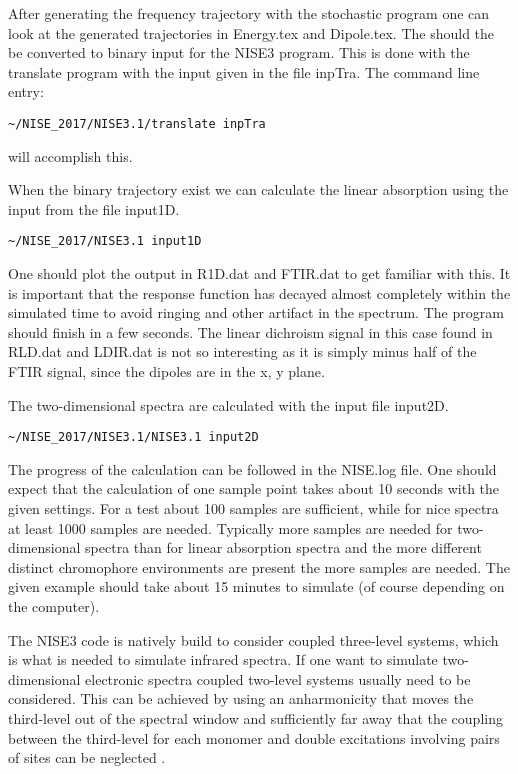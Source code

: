 After generating the frequency trajectory with the stochastic program one can look at the generated
trajectories in Energy.tex and Dipole.tex. The should the be converted to binary input for the NISE3
program. This is done with the translate program with the input given in the file inpTra.
The command line entry:
\begin{verbatim}
~/NISE_2017/NISE3.1/translate inpTra
\end{verbatim}
will accomplish this.

When the binary trajectory exist we can calculate the linear absorption using the input from the file input1D.
\begin{verbatim}
~/NISE_2017/NISE3.1 input1D
\end{verbatim}
One should plot the output in R1D.dat and FTIR.dat to get familiar with this. It is 
important that the response function has decayed almost completely within the simulated 
time to avoid ringing and other artifact in the spectrum. The program should finish in a 
few seconds. The linear dichroism signal in this case found in RLD.dat and LDIR.dat is 
not so interesting as it is simply minus half of the FTIR signal, since the dipoles are in the 
x, y plane. 

The two-dimensional spectra are calculated with the input file input2D.
\begin{verbatim}
~/NISE_2017/NISE3.1/NISE3.1 input2D
\end{verbatim}
The progress of the calculation can be followed in the NISE.log file. One should expect that the calculation of one sample point takes about 10 seconds with the given settings. For a test about 100 samples are sufficient, while for nice spectra at least 1000 samples are needed. Typically more samples are needed for two-dimensional spectra than for linear absorption spectra and the more different distinct chromophore environments are present the more samples are needed. The given example should take about 15 minutes to simulate (of course depending on the computer).

The NISE3 code is natively build to consider coupled three-level systems, which is what is needed to simulate infrared spectra. If one want to simulate two-dimensional electronic spectra coupled two-level systems usually need to be considered. This can be achieved by using an anharmonicity that moves the third-level out of the spectral window and sufficiently far away that the coupling between the third-level for each monomer and double excitations involving pairs of sites can be neglected \cite{Olbrich.2011.JPCB.115.8609,Liang.2012.JCTC.8.1706}. 

